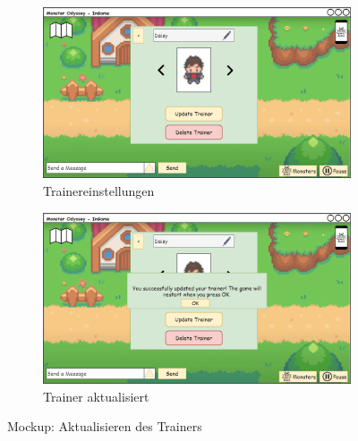 \begin{figure}[H]
    \centering
    \begin{subfigure}[b]{0.4\textwidth}
        \includegraphics[width=\textwidth]{images/mockups/Bonusfeatures/TrainerSettings/TrainerSetting.png}
        \caption{Trainereinstellungen}
        \label{fig: Trainereinstellungen}
    \end{subfigure}
    \hfill
    \begin{subfigure}[b]{0.4\textwidth}
        \includegraphics[width=\textwidth]{images/mockups/Bonusfeatures/TrainerSettings/TrainerSettingChanged.png}
        \caption{Trainer aktualisiert}
        \label{fig: Trainer aktualisiert}
    \end{subfigure}
    \caption{Mockup: Aktualisieren des Trainers}
    \label{fig: Aktualisieren des Trainers}
\end{figure}
